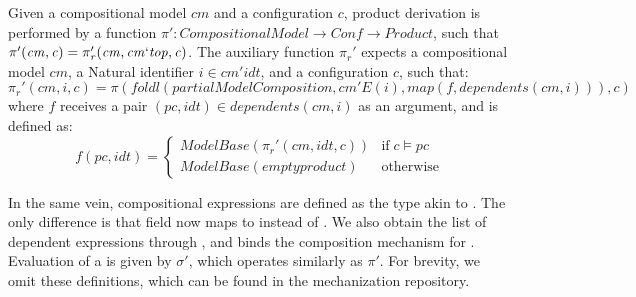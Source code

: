 \begin{definition}
\label{defn:pi-prime}
Given a compositional model $cm$ and a configuration $c$, product derivation is performed by a function $\mathit{\pi': CompositionalModel \to Conf \to Product}$, such that $\mathit{\pi'(cm,c)=\pi_r'(cm,cm`top,c)}$. 
The auxiliary function $\pi_r'$ expects a compositional model $cm$, a Natural identifier $i \in \mathit{cm'idt}$, and a configuration $c$, such that:
\[\mathit{\pi_r'(cm,i,c)} = \mathit{\pi(foldl(partialModelComposition, cm'E(i), map(f,dependents(cm,i))),c)}\] where $f$ receives a pair $(pc,idt) \in \mathit{dependents(cm, i)}$ as an argument, and is defined as:
\[\mathit{f(pc,idt)}=\begin{cases}
            \mathit{ModelBase(\pi_r'(cm, idt, c))} &\mbox{if} \; c \models pc \\
            \mathit{ModelBase(emptyproduct)} &\mbox{otherwise}
        \end{cases}\]
\end{definition}

In the same vein, compositional expressions are defined as the  type akin to .
The only difference is that field  now maps to  instead of .
We also obtain the list of dependent expressions through , and  binds the composition mechanism for .
Evaluation of a  is given by 
$\sigma'$, 
which operates similarly as 
$\pi'$.
For brevity, we omit these definitions, which can be found in the mechanization repository.


